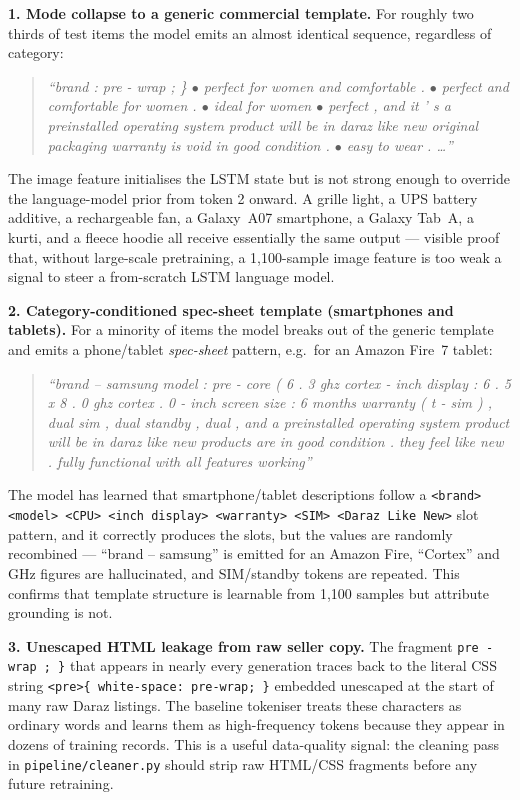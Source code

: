 \documentclass[12pt,a4paper]{article}
\begin{document}
\textbf{1. Mode collapse to a generic commercial template.} For roughly two thirds
of test items the model emits an almost identical sequence, regardless of category:
\begin{quote}\small\itshape
``brand : pre - wrap ; \} $\bullet$ perfect for women and comfortable . $\bullet$
perfect and comfortable for women . $\bullet$ ideal for women $\bullet$ perfect ,
and it ' s a preinstalled operating system product will be in daraz like new
original packaging warranty is void in good condition . $\bullet$ easy to wear . \dots''
\end{quote}
The image feature initialises the LSTM state but is not strong enough to override
the language-model prior from token 2 onward. A grille light, a UPS battery
additive, a rechargeable fan, a Galaxy~A07 smartphone, a Galaxy Tab~A, a kurti,
and a fleece hoodie all receive essentially the same output --- visible proof
that, without large-scale pretraining, a 1{,}100-sample image feature is too
weak a signal to steer a from-scratch LSTM language model.

\textbf{2. Category-conditioned spec-sheet template (smartphones and tablets).}
For a minority of items the model breaks out of the generic template and emits a
phone/tablet \emph{spec-sheet} pattern, e.g.\ for an Amazon Fire~7 tablet:
\begin{quote}\small\itshape
``brand -- samsung model : pre - core ( 6 . 3 ghz cortex - inch display : 6 . 5
x 8 . 0 ghz cortex . 0 - inch screen size : 6 months warranty ( t - sim ) , dual
sim , dual standby , dual , and a preinstalled operating system product will be
in daraz like new products are in good condition . they feel like new . fully
functional with all features working''
\end{quote}
The model has learned that smartphone/tablet descriptions follow a
\texttt{<brand> <model> <CPU> <inch display> <warranty> <SIM> <Daraz Like New>}
slot pattern, and it correctly produces the slots, but the values are
randomly recombined --- ``brand -- samsung'' is emitted for an Amazon Fire,
``Cortex'' and GHz figures are hallucinated, and SIM/standby tokens are repeated.
This confirms that template structure is learnable from 1{,}100 samples but
attribute grounding is not.

\textbf{3. Unescaped HTML leakage from raw seller copy.} The fragment
\texttt{pre - wrap ; \}} that appears in nearly every generation traces back to
the literal CSS string \texttt{<pre>\{ white-space: pre-wrap; \}} embedded
unescaped at the start of many raw Daraz listings. The baseline tokeniser
treats these characters as ordinary words and learns them as high-frequency
tokens because they appear in dozens of training records. This is a useful
data-quality signal: the cleaning pass in \texttt{pipeline/cleaner.py} should
strip raw HTML/CSS fragments before any future retraining.
\end{document}
